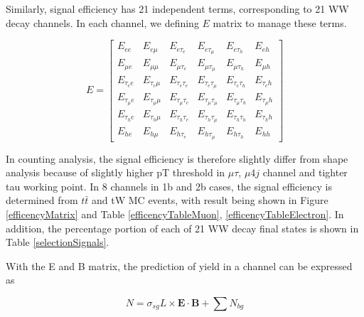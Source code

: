 Similarly, signal efficiency has 21 independent terms, corresponding to 21
WW decay channels. In each channel, we defining $E$ matrix to manage these terms.

\begin{equation}
	E = 
	\begin{bmatrix}
    E_{ee}          & E_{e\mu}          & E_{e\tau_e}       & E_{e\tau_\mu}        & E_{e\tau_h}        & E_{eh}        \\
    E_{\mu e}       & E_{\mu \mu}       & E_{\mu \tau_e}    & E_{\mu \tau_\mu}     & E_{\mu \tau_h}     & E_{\mu h}     \\
    E_{\tau_e e}    & E_{\tau_e \mu}    & E_{\tau_e \tau_e} & E_{\tau_e \tau_\mu}  & E_{\tau_e \tau_h}  & E_{\tau_e h}  \\
    E_{\tau_\mu e}  & E_{\tau_\mu\mu}   & E_{\tau_\mu\tau_e}& E_{\tau_\mu\tau_\mu} & E_{\tau_\mu\tau_h} & E_{\tau_\mu h}\\
    E_{\tau_h e}    & E_{\tau_h \mu}    & E_{\tau_h \tau_e} & E_{\tau_h \tau_\mu}  & E_{\tau_h \tau_h } & E_{\tau_h h}  \\
    E_{he}          & E_{h\mu}          & E_{h\tau_e}       & E_{h\tau_\mu}        & E_{h\tau_h}        & E_{hh} 
	\end{bmatrix}
    \label{eq:eff_matrix}
\end{equation}


In counting analysis, the signal efficiency is therefore slightly differ 
from shape analysis because of slightly higher pT threshold in $\mu\tau$, $\mu4j$ channel
and tighter tau working point. In 8 channels in 1b and 2b cases, the signal efficiency 
is determined from $t\bar{t}$ and {tW} MC events, with result being shown in Figure 
\ref{efficencyMatrix} and Table \ref{efficencyTableMuon}, \ref{efficencyTableElectron}.
In addition, the percentage portion of each of 21 WW decay final states is 
shown in Table \ref{selectionSignals}.

With the E and B matrix, the prediction of yield in a channel can be expressed as

\begin{equation}
    N = \sigma_{sg}L\times \textbf{E} \cdot \textbf{B} + \sum N_{bg}
    \label{prediction}
\end{equation}


